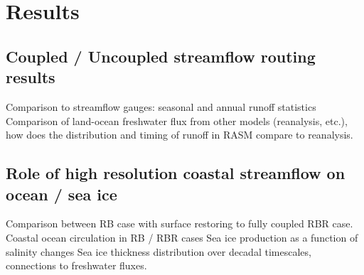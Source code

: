 \section{Results}

\subsection{Coupled / Uncoupled streamflow routing results}

Comparison to streamflow gauges: seasonal and annual runoff statistics
Comparison of land-ocean freshwater flux from other models (reanalysis, etc.), how does the distribution and timing of runoff in RASM compare to reanalysis.

\subsection{Role of high resolution coastal streamflow on ocean / sea ice}


Comparison between RB case with surface restoring to fully coupled RBR case.
Coastal ocean circulation in RB / RBR cases
Sea ice production as a function of salinity changes
Sea ice thickness distribution over decadal timescales, connections to freshwater fluxes.

  